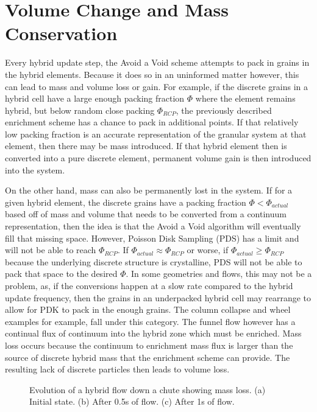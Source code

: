 \section{Volume Change and Mass Conservation}
Every hybrid update step, the Avoid a Void scheme attempts to pack in grains in the hybrid elements. Because it does so in an uninformed matter however, this can lead to mass and volume loss or gain. For example, if the discrete grains in a hybrid cell have a large enough packing fraction $\Phi$ where the element remains hybrid, but below random close packing $\Phi_{RCP}$, the previously described enrichment scheme has a chance to pack in additional points. If that relatively low packing fraction is an accurate representation of the granular system at that element, then there may be mass introduced. If that hybrid element then is converted into a pure discrete element, permanent volume gain is then introduced into the system. 

On the other hand, mass can also be permanently lost in the system. If for a given hybrid element, the discrete grains have a packing fraction $\Phi < \Phi_{actual}$ based off of mass and volume that needs to be converted from a continuum representation, then the idea is that the Avoid a Void algorithm will eventually fill that missing space. However, Poisson Disk Sampling (PDS) has a limit and will not be able to reach $\Phi_{RCP}$. If $\Phi_{actual} \approx \Phi_{RCP}$ or worse, if $\Phi_{actual} \geq \Phi_{RCP}$ because the underlying discrete structure is crystalline, PDS will not be able to pack that space to the desired $\Phi$. In some geometries and flows, this may not be a problem, as, if the conversions happen at a slow rate compared to the hybrid update frequency, then the grains in an underpacked hybrid cell may rearrange to allow for PDK to pack in the enough grains. The column collapse and wheel examples for example, fall under this category. The funnel flow however has a continual flux of continuum into the hybrid zone which must be enriched. Mass loss occurs because the continuum to enrichment mass flux is larger than the source of discrete hybrid mass that the enrichment scheme can provide. The resulting lack of discrete particles then leads to volume loss.

\begin{figure}[htp] 
    \centering
    \caption{Evolution of a hybrid flow down a chute showing mass loss. (a) Initial state. (b) After 0.5s of flow. (c) After 1s of flow.}%
    \label{chute_flow_old}
\end{figure}

